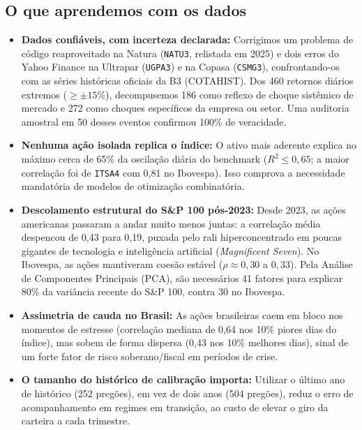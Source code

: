 \documentclass[11pt,a4paper]{article}
\begin{document}
\subsection{O que aprendemos com os dados}
\begin{itemize}[leftmargin=*]
    \item \textbf{Dados confiáveis, com incerteza declarada:} Corrigimos um problema de código reaproveitado na Natura (\texttt{NATU3}, relistada em 2025) e dois erros do Yahoo Finance na Ultrapar (\texttt{UGPA3}) e na Copasa (\texttt{CSMG3}), confrontando-os com as séries históricas oficiais da B3 (COTAHIST). Dos 460 retornos diários extremos ($\ge \pm 15\%$), decompusemos 186 como reflexo de choque sistêmico de mercado e 272 como choques específicos da empresa ou setor. Uma auditoria amostral em 50 desses eventos confirmou 100\% de veracidade.
    \item \textbf{Nenhuma ação isolada replica o índice:} O ativo mais aderente explica no máximo cerca de 65\% da oscilação diária do benchmark ($R^2 \le 0,65$; a maior correlação foi de \texttt{ITSA4} com 0,81 no Ibovespa). Isso comprova a necessidade mandatória de modelos de otimização combinatória.
    \item \textbf{Descolamento estrutural do S\&P 100 pós-2023:} Desde 2023, as ações americanas passaram a andar muito menos juntas: a correlação média despencou de 0,43 para 0,19, puxada pelo rali hiperconcentrado em poucas gigantes de tecnologia e inteligência artificial (\textit{Magnificent Seven}). No Ibovespa, as ações mantiveram coesão estável ($\rho \approx 0,30$ a $0,33$). Pela Análise de Componentes Principais (PCA), são necessários 41 fatores para explicar 80\% da variância recente do S\&P 100, contra 30 no Ibovespa.
    \item \textbf{Assimetria de cauda no Brasil:} As ações brasileiras caem em bloco nos momentos de estresse (correlação mediana de 0,64 nos 10\% piores dias do índice), mas sobem de forma dispersa (0,43 nos 10\% melhores dias), sinal de um forte fator de risco soberano/fiscal em períodos de crise.
    \item \textbf{O tamanho do histórico de calibração importa:} Utilizar o último ano de histórico (252 pregões), em vez de dois anos (504 pregões), reduz o erro de acompanhamento em regimes em transição, ao custo de elevar o giro da carteira a cada trimestre.
\end{itemize}
\end{document}
